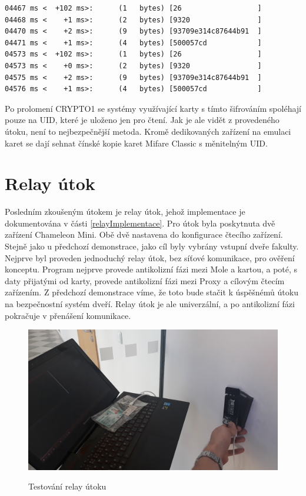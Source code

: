 \begin{lstlisting}[caption=Část komunikace čtecího zařízení, label={emulaceZaznam}]
04467 ms <  +102 ms>:      (1   bytes) [26                  ]
04468 ms <    +1 ms>:      (2   bytes) [9320                ]
04470 ms <    +2 ms>:      (9   bytes) [93709e314c87644b91  ]
04471 ms <    +1 ms>:      (4   bytes) [500057cd            ]
04573 ms <  +102 ms>:      (1   bytes) [26                  ]
04573 ms <    +0 ms>:      (2   bytes) [9320                ]
04575 ms <    +2 ms>:      (9   bytes) [93709e314c87644b91  ]
04576 ms <    +1 ms>:      (4   bytes) [500057cd            ]
\end{lstlisting}
Po prolomení CRYPTO1 se systémy využívající karty s tímto šifrováním spoléhají pouze na UID, které je uloženo jen pro čtení. Jak je ale vidět z provedeného útoku, není to nejbezpečnější metoda. Kromě dedikovaných zařízení na emulaci karet se dají sehnat čínské kopie karet Mifare Classic s měnitelným UID. 

\section{Relay útok}
Posledním zkoušeným útokem je relay útok, jehož implementace je dokumentována v části \ref{relayImplementace}. Pro útok byla poskytnuta dvě zařízení Chameleon Mini. Obě dvě nastavena do konfigurace čtecího zařízení. Stejně jako u předchozí demonstrace, jako cíl byly vybrány vstupní dveře fakulty. Nejprve byl proveden jednoduchý relay útok, bez síťové komunikace, pro ověření konceptu. Program nejprve provede antikolizní fázi mezi Mole a kartou, a poté, s daty přijatými od karty, provede antikolizní fázi mezi Proxy a cílovým čtecím zařízením. Z předchozí demonstrace víme, že toto bude stačit k úspěšnémů útoku na bezpečnostní systém dveří. Relay útok je ale univerzální, a po antikolizní fázi pokračuje v přenášení komunikace. \par

\begin{figure}[ht]\centering
  \centering
  \includegraphics[width=\linewidth]{obrazky-figures/obrazekPokusRelay.jpg}\\[1pt]  
  \caption{Testování relay útoku}    
  \label{obrazekPokusRelay}
\end{figure}

